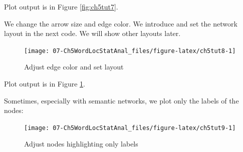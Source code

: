 \documentclass[
]{article}
\newenvironment{Shaded}{\begin{snugshade}}{\end{snugshade}}
\newcommand{\AttributeTok}[1]{\textcolor[rgb]{0.13,0.29,0.53}{#1}}
\newcommand{\CommentTok}[1]{\textcolor[rgb]{0.56,0.35,0.01}{\textit{#1}}}
\newcommand{\DecValTok}[1]{\textcolor[rgb]{0.00,0.00,0.81}{#1}}
\newcommand{\FunctionTok}[1]{\textcolor[rgb]{0.13,0.29,0.53}{\textbf{#1}}}
\newcommand{\NormalTok}[1]{#1}
\newcommand{\OtherTok}[1]{\textcolor[rgb]{0.56,0.35,0.01}{#1}}
\newcommand{\SpecialCharTok}[1]{\textcolor[rgb]{0.81,0.36,0.00}{\textbf{#1}}}
\newcommand{\StringTok}[1]{\textcolor[rgb]{0.31,0.60,0.02}{#1}}
\begin{document}
Plot output is in Figure \ref{fig:ch5tut7}.

We change the arrow size and edge color. We introduce and set the network layout in the next code. We will show other layouts later.

\begin{Shaded}
\end{Shaded}

\begin{figure}

{\centering \texttt{[image: 07-Ch5WordLocStatAnal\_files/figure-latex/ch5tut8-1]} 

}

\caption{Adjust edge color and set layout}\label{fig:ch5tut8}
\end{figure}

Plot output is in Figure \ref{fig:ch5tut8}.

Sometimes, especially with semantic networks, we plot only the labels of the nodes:

\begin{Shaded}
\end{Shaded}

\begin{figure}

{\centering \texttt{[image: 07-Ch5WordLocStatAnal\_files/figure-latex/ch5tut9-1]} 

}

\caption{Adjust nodes highlighting only labels}\label{fig:ch5tut9}
\end{figure}
\end{document}
